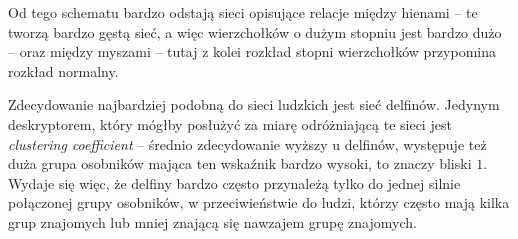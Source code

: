 \documentclass[11pt]{scrartcl}
\begin{document}
Od tego schematu bardzo odstają sieci opisujące relacje między hienami -- te tworzą bardzo gęstą sieć, a więc wierzchołków o dużym stopniu jest bardzo dużo -- oraz między myszami -- tutaj z kolei rozkład stopni wierzchołków przypomina rozkład normalny.

Zdecydowanie najbardziej podobną do sieci ludzkich jest sieć delfinów. Jedynym deskryptorem, który mógłby posłużyć za miarę odróżniającą te sieci jest \textit{clustering coefficient} -- średnio zdecydowanie wyższy u delfinów, występuje też duża grupa osobników mająca ten wskaźnik bardzo wysoki, to znaczy bliski $1$. Wydaje się więc, że delfiny bardzo często przynależą tylko do jednej silnie połączonej grupy osobników, w przeciwieństwie do ludzi, którzy często mają kilka grup znajomych lub mniej znającą się nawzajem grupę znajomych.

\printbibliography[heading=bibintoc]
\end{document}
